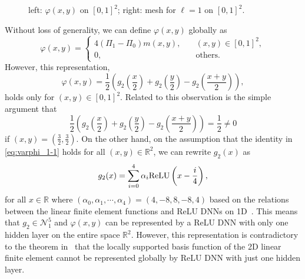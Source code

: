 \begin{figure}[h!]
\begin{minipage}[t]{0.45\linewidth}
	\end{minipage}
	\caption{left: $\varphi(x,y)$ on $[0,1]^2$; right:  mesh for $\ell=1$ on $[0,1]^2$.}
	\label{fig:varphi_1}
\end{figure}
Without loss of generality, we can define $\varphi(x,y)$ globally as
\begin{equation}\label{key}
	\varphi(x,y) = \begin{cases}
		4(\Pi_1- \Pi_{0})m (x,y), \quad &(x,y) \in [0,1]^2, \\
		0, \quad &\text{others}.
	\end{cases}
\end{equation}
However, this representation,
\begin{equation}\label{eq:varphi_1-1}
	\varphi(x,y) = \frac{1}{2}\left(g_{2}\left(\frac{x}{2}\right)+g_2\left(\frac{y}{2}\right)-g_2\left(\frac{x+y}{2}\right)\right),
\end{equation}
holds only for $(x,y) \in [0,1]^2$. 
Related to this observation is the simple argument that 
\begin{equation}\label{key}
	\frac{1}{2}\left(g_{2}\left(\frac{x}{2}\right)+g_2\left(\frac{y}{2}\right)-g_2\left(\frac{x+y}{2}\right)\right) = \frac{1}{2} \neq 0
\end{equation}
if $(x,y) = (\frac{3}{2}, \frac{3}{2})$.
On the other hand, on the assumption that the identity in \eqref{eq:varphi_1-1} holds for all $(x,y) \in \mathbb{R}^2$, we can rewrite $g_2(x)$ as
\begin{equation}\label{eq:defg2_2}
	g_2(x) = \sum_{i=0}^4 \alpha_i {\rm ReLU}\left(x-\frac{i}{4}\right),
\end{equation}
for all $x\in \mathbb{R}$ where $(\alpha_0,\alpha_1,\cdots, \alpha_4) = (4, -8, 8, -8, 4)$ based on the relations between the linear finite element functions and ReLU DNNs on 1D~\cite{he2020relu}.
This means that $g_2 \in {\mathcal N}_{1}^5$ and $\varphi(x,y)$ can be represented by a ReLU DNN with only one hidden layer on the entire space $\mathbb{R}^2$.
However, this representation is contradictory to the theorem in~\cite{he2020relu} that the locally supported basis function of the 2D linear finite element cannot be represented globally by ReLU DNN  with just one hidden layer.

